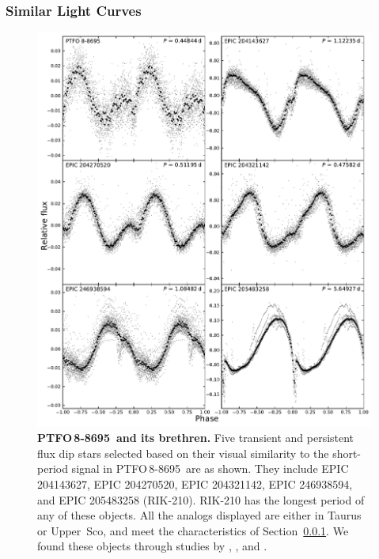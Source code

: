 \documentclass[12pt,twocolumn,tighten]{aastex62}
\newcommand{\ptfo}{PTFO$\,$8-8695}
\begin{document}
\subsubsection{Similar Light Curves}
\label{subsec:dipstars}

\begin{figure}[hbtp]
	\begin{center}
		\leavevmode
		\includegraphics[width=1\textwidth]{f7.pdf}
	\end{center}
	\vspace{-0.7cm}
  \caption{ {\bf \ptfo\ and its brethren.}
    Five transient and persistent flux dip stars selected based on
    their visual similarity to the short-period signal in \ptfo\ are as
    shown.
    They include
    EPIC 204143627,
    EPIC 204270520,
    EPIC 204321142,
    EPIC 246938594,
    and
    EPIC 205483258 (RIK-210).
    RIK-210 has the longest period of any of these objects.  All the
    analogs displayed are either in Taurus or Upper~Sco, and meet the
    characteristics of Section~\ref{subsec:dipstars}.  We found these
    objects through studies by \citet{stauffer_orbiting_2017},
    \citet{david_transient_2017}, and \citet{rebull_usco_2018}.
		\label{fig:brethren}
	}
\end{figure}
\end{document}
